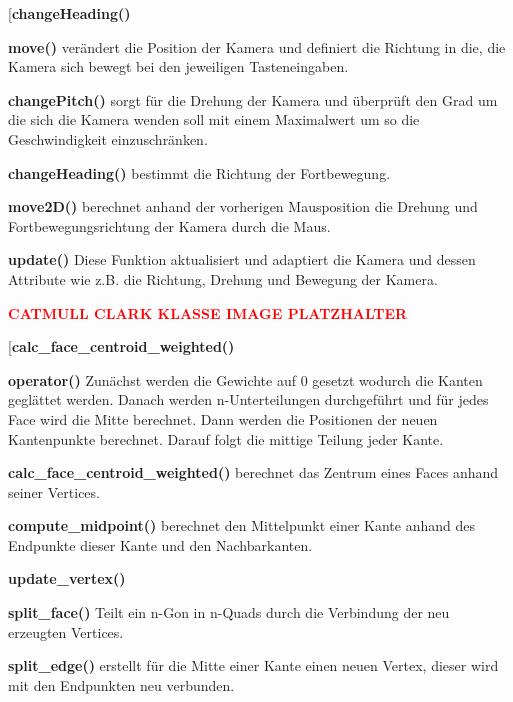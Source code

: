 	\begin{labeling}[]{[\textbf{changeHeading()}}%
	\item[\textbf{move()}] verändert die Position der Kamera und definiert die Richtung in die, die Kamera sich bewegt bei den jeweiligen Tasteneingaben.
	\item[\textbf{changePitch()}] sorgt für die Drehung der Kamera und überprüft den Grad um die sich die Kamera wenden soll mit einem Maximalwert um so die Geschwindigkeit einzuschränken.
	\item[\textbf{changeHeading()}] bestimmt die Richtung der Fortbewegung.
	\item[\textbf{move2D()}] berechnet anhand der vorherigen Mausposition die Drehung und Fortbewegungsrichtung der Kamera durch die Maus.
	\item[\textbf{update()}] Diese Funktion aktualisiert und adaptiert die Kamera und dessen Attribute wie z.B. die Richtung, Drehung und Bewegung der Kamera.
	\end{labeling}

\textcolor{red}{\textbf{CATMULL CLARK KLASSE IMAGE PLATZHALTER}}

	\begin{labeling}[]{[\textbf{calc\_face\_centroid\_weighted()}}%
	\item[\textbf{operator()}] Zunächst werden die Gewichte auf 0 gesetzt wodurch die Kanten geglättet werden. Danach werden n-Unterteilungen durchgeführt und für jedes Face wird die Mitte berechnet. Dann werden die Positionen der neuen Kantenpunkte berechnet. Darauf folgt die mittige Teilung jeder Kante.
	\item[\textbf{calc\_face\_centroid\_weighted()}] berechnet das Zentrum eines Faces anhand seiner Vertices.
	\item[\textbf{compute\_midpoint()}] berechnet den Mittelpunkt einer Kante anhand des Endpunkte dieser Kante und den Nachbarkanten.
	\item[\textbf{update\_vertex()}]
	\item[\textbf{split\_face()}] Teilt ein n-Gon in n-Quads durch die Verbindung der neu erzeugten Vertices.
	\item[\textbf{split\_edge()}] erstellt für die Mitte einer Kante einen neuen Vertex, dieser wird mit den Endpunkten neu verbunden.
	\end{labeling}

